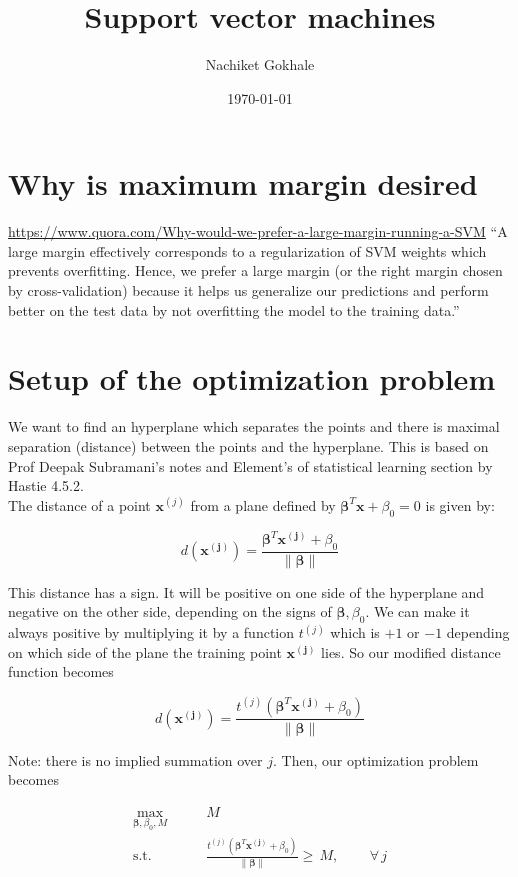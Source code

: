 \documentclass{article}
\newcommand{\beq}{\begin{equation}}
\newcommand{\eeq}{\end{equation}}
\begin{document}
\title{Support vector machines}
\author{Nachiket Gokhale}
\date{\today}
\maketitle
\section{Why is maximum margin desired}
\url{https://www.quora.com/Why-would-we-prefer-a-large-margin-running-a-SVM}
``A large margin effectively corresponds to a regularization of SVM weights which prevents overfitting. Hence, we prefer a large margin (or the right margin chosen by cross-validation) because it helps us generalize our predictions and perform better on the test data by not overfitting the model to the training data.''


\section{Setup of the optimization problem}
We want to find an hyperplane which separates the points and there is maximal separation (distance) between the points and the hyperplane. This is based on Prof Deepak Subramani's notes and Element's of statistical learning section by Hastie 4.5.2.\\

The distance of a point $\pmb{x}^{(j)}$ from a plane defined by $\pmb{\beta}^{T}\pmb{x} + \beta_0 = 0$ is given by:

\beq
d(\pmb{x^{(j)}}) = \frac{\pmb{\beta}^T\pmb{x^{(j)}} + \beta_0}{\|\pmb{\beta}\|}
\eeq

This distance has a sign. It will be positive on one side of the hyperplane and negative on the other side, depending on the signs of $\pmb{\beta},\beta_0$. We can make it always positive by multiplying it by a function $t^{(j)}$ which is $+1$ or $-1$ depending on which side of the plane the training point $\pmb{x^{(j)}}$ lies. So our modified distance function becomes

\beq
d(\pmb{x^{(j)}}) = \frac{t^{(j)}(\pmb{\beta}^T{\pmb{x^{(j)}}} + \beta_0)}{\|\pmb{\beta}\|}
\eeq

Note: there is no implied summation over $j$. Then, our optimization problem becomes

\beq
\label{eqn:formulation1}
\begin{aligned}
  \max_{\pmb{\beta},\beta_0,M} &  \qquad M \\
  \textrm{s.t.} & \qquad \frac{t^{(j)}(\pmb{\beta}^T{\pmb{x^{(j)}}} + \beta_0)}{\|\pmb{\beta}\|} \ge\, M, \, \qquad \forall \,{j}
\end{aligned}
\eeq
\end{document}
